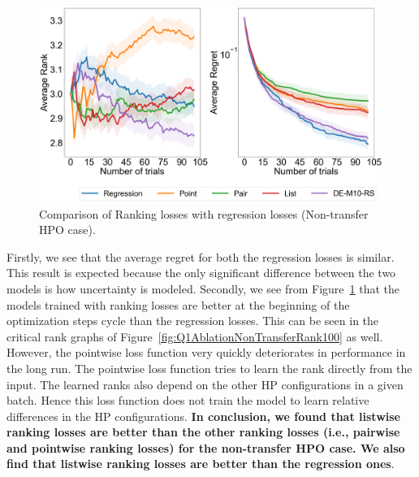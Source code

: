 \documentclass[12pt, twoside, ngerman]{report}
\begin{document}
\begin{figure}[h]
  \centering
    \includegraphics[scale=0.25]{images/Q1AblationNonTransfer}
    \caption{Comparison of Ranking losses with regression losses (Non-transfer HPO case).}
    \label{fig:Q1AblationNonTransfer}
\end{figure}

Firstly, we see that the average regret for both the regression losses is similar. This result is expected because the only significant difference between the two models is how uncertainty is modeled. Secondly,  we see from Figure~\ref{fig:Q1AblationNonTransfer} that the models trained with ranking losses are better at the beginning of the optimization steps cycle than the regression losses. This can be seen in the critical rank graphs of Figure~\ref{fig:Q1AblationNonTransferRank100} as well. However, the pointwise loss function very quickly deteriorates in performance in the long run. The pointwise loss function tries to learn the rank directly from the input. The learned ranks also depend on the other HP configurations in a given batch. Hence this loss function does not train the model to learn relative differences in the HP configurations.
\textbf{In conclusion, we found that listwise ranking losses are better than the other ranking losses (i.e., pairwise and pointwise ranking losses) for the non-transfer HPO case.
We also find that listwise ranking losses are better than the regression ones}.
\end{document}
